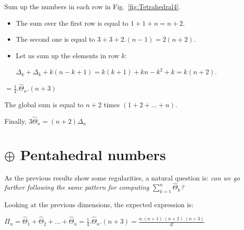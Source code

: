 Sum up the numbers in each row in Fig.~\ref{fig:Tetrahedral4}.
\begin{itemize}
\item 
The sum over the first row is equal to $1+1+n = n+2$.
\item
The second one is equal to $3 + 3 + 2.(n-1) = 2(n+2)$. 
\item
Let us sum up the elements in row $k$: 

$\Delta_k + \Delta_k + k(n-k+1)  = k(k+1) + kn-k^2+k = k(n+2)$.
\end{itemize}
$= \frac{1}{4}.\widehat{\Theta}_n.(n+3)$

The global sum is equal to $n+2$ times $(1+2+...+n)$.

Finally, $3 \widehat{\Theta}_n = (n+2) \Delta_n$
\medskip

\noindent {}


\section{$\oplus$ Pentahedral numbers}

As the previous results show some regularities, a natural question is: \textit{can we go further following the same pattern for computing 
$ \sum_{k=1}^{n} \widehat{\Theta}_k$?}
\medskip

Looking at the previous dimensions, the expected expression is:

$\Pi_n = \widehat{\Theta}_1 + \widehat{\Theta}_2 + ... + \widehat{\Theta}_n = \frac{1}{4}.\widehat{\Theta}_n.(n+3) = \frac{n.(n+1).(n+2).(n+3)}{4!} $

